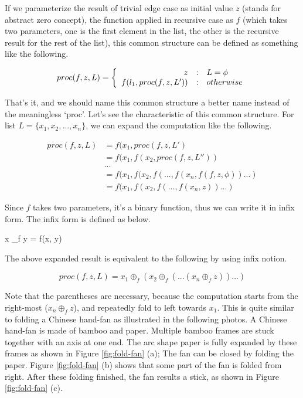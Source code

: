 \documentclass[b5paper]{article}
\begin{document}
If we parameterize the result of trivial edge case as initial value $z$ (stands for abstract zero concept), the
function applied in recursive case as $f$ (which takes two parameters, one is the first element in the list,
the other is the recursive result for the rest of the list), this common structure can be defined as something
like the following.

\[
proc(f, z, L) = \left \{
  \begin{array}
  {r@{\quad:\quad}l}
  z & L = \phi \\
  f(l_1, proc(f, z, L')) & otherwise
  \end{array}
\right.
\]

That's it, and we should name this common structure a better name instead of the meaningless `proc'. Let's
see the characteristic of this common structure. For list $L = \{x_1, x_2, ..., x_n \}$, we can expand the
computation like the following.

\[
\begin{array}{rl}
proc(f, z, L) & = f(x_1, proc(f, z, L') \\
        & = f(x_1, f(x_2, proc(f, z, L'')) \\
        & ... \\
        & = f(x_1, f(x_2, f(..., f(x_n, f(f, z, \phi))...) \\
        & = f(x_1, f(x_2, f(..., f(x_n, z))...)
\end{array}
\]

Since $f$ takes two parameters, it's a binary function, thus we can write it in infix form. The infix
form is defined as below.

\be
x \oplus_f y = f(x, y)
\ee

The above expanded result is equivalent to the following by using infix notion.

\[
proc(f, z, L) = x_1 \oplus_f (x_2 \oplus_f (... (x_n \oplus_f z))...)
\]

Note that the parentheses are necessary, because the computation starts from the right-most ($x_n \oplus_f z$),
and repeatedly fold to left towards $x_1$. This is quite similar to folding a Chinese hand-fan as illustrated
in the following photos. A Chinese hand-fan is made of bamboo and paper. Multiple bamboo frames are stuck
together with an axis at one end. The arc shape paper is fully expanded by these frames as shown in Figure
\ref{fig:fold-fan} (a);
The fan can be closed by folding the paper. Figure \ref{fig:fold-fan} (b) shows that some part of the fan
is folded from right. After these folding finished, the fan results a stick, as shown in Figure \ref{fig:fold-fan} (c).
\end{document}
